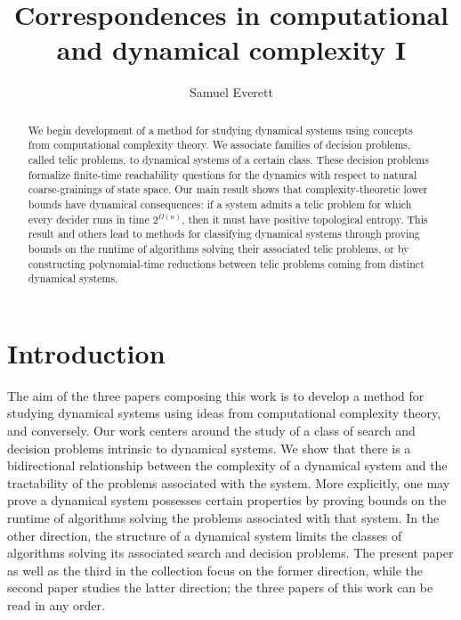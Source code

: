 \documentclass{amsart}
\title[Correspondences in computational and dynamical complexity I]{Correspondences in computational and dynamical complexity I}
\author[S. Everett]{Samuel Everett}
\date{}
\theoremstyle{theorem}
\theoremstyle{remark}
\numberwithin{equation}{section}
\begin{document}

\begin{abstract}We begin development of a method for studying dynamical systems using concepts from computational complexity theory. We associate families of decision problems, called telic problems, to dynamical systems of a certain class. These decision problems formalize finite-time reachability questions for the dynamics with respect to natural coarse-grainings of state space. Our main result shows that complexity-theoretic lower bounds have dynamical consequences: if a system admits a telic problem for which every decider runs in time $2^{\Omega(n)}$, then it must have positive topological entropy. This result and others lead to methods for classifying dynamical systems through proving bounds on the runtime of algorithms solving their associated telic problems, or by constructing polynomial-time reductions between telic problems coming from distinct dynamical systems.\end{abstract}

\maketitle
\tableofcontents
\pagebreak


\section{Introduction}

The aim of the three papers composing this work is to develop a method for studying dynamical systems using ideas from computational complexity theory, and conversely.
Our work centers around the study of a class of search and decision problems intrinsic to dynamical systems.
We show that there is a bidirectional relationship between the complexity of a dynamical system and the tractability of the problems associated with the system.
More explicitly, one may prove a dynamical system possesses certain properties by proving bounds on the runtime of algorithms solving the problems associated with that system.
In the other direction, the structure of a dynamical system limits the classes of algorithms solving its associated search and decision problems.
The present paper as well as the third \cite{everett3} in the collection focus on the former direction, while the second paper \cite{everett2} studies the latter direction; the three papers of this work can be read in any order.
\end{document}
